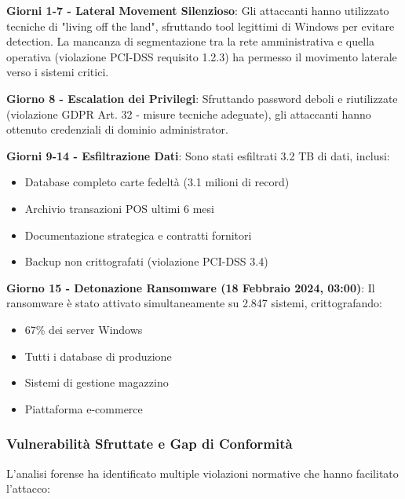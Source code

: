 \textbf{Giorni 1-7 - Lateral Movement Silenzioso}:
Gli attaccanti hanno utilizzato tecniche di "living off the land", sfruttando tool legittimi di Windows per evitare detection. La mancanza di segmentazione tra la rete amministrativa e quella operativa (violazione PCI-DSS requisito 1.2.3) ha permesso il movimento laterale verso i sistemi critici.

\textbf{Giorno 8 - Escalation dei Privilegi}:
Sfruttando password deboli e riutilizzate (violazione GDPR Art. 32 - misure tecniche adeguate), gli attaccanti hanno ottenuto credenziali di dominio administrator.

\textbf{Giorni 9-14 - Esfiltrazione Dati}:
Sono stati esfiltrati 3.2 TB di dati, inclusi:
\begin{itemize}
    \item Database completo carte fedeltà (3.1 milioni di record)
    \item Archivio transazioni POS ultimi 6 mesi
    \item Documentazione strategica e contratti fornitori
    \item Backup non crittografati (violazione PCI-DSS 3.4)
\end{itemize}

\textbf{Giorno 15 - Detonazione Ransomware (18 Febbraio 2024, 03:00)}:
Il ransomware è stato attivato simultaneamente su 2.847 sistemi, crittografando:
\begin{itemize}
    \item 67\% dei server Windows
    \item Tutti i database di produzione
    \item Sistemi di gestione magazzino
    \item Piattaforma e-commerce
\end{itemize}

\subsubsection{Vulnerabilità Sfruttate e Gap di Conformità}

L'analisi forense ha identificato multiple violazioni normative che hanno facilitato l'attacco:

